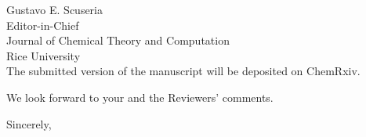\documentclass[12pt]{letter}
\begin{document}
\begin{letter}{Gustavo E. Scuseria \\
    Editor-in-Chief \\
    Journal of Chemical Theory and Computation \\
    Rice University \\
    }
The submitted version of the manuscript will be deposited on ChemRxiv.

We look forward to your and the Reviewers' comments.

\closing{Sincerely,}

\end{letter}
\end{document}
